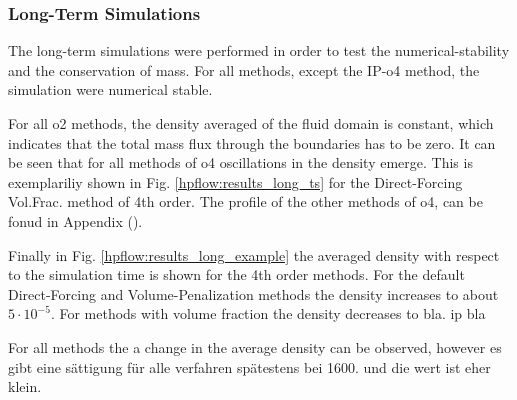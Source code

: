 \subsubsection{Long-Term Simulations}

The long-term simulations were performed in order to test the numerical-stability and the conservation of mass.
For all methods, except the IP-o4 method, the simulation were numerical stable.

For all o2 methods, the density averaged of the fluid domain is constant, which indicates that the total mass flux through the
boundaries has to be zero.
It can be seen that for all methods of o4 oscillations in the density emerge.
This is exemplariliy shown in Fig.  \ref{hpflow:results_long_ts} for the Direct-Forcing Vol.Frac. method of 4th order.
The profile of the other methods of o4, can be fonud in Appendix ().

Finally in Fig. \ref{hpflow:results_long_example} the averaged density with respect to the simulation time is shown for the
4th order methods.
For the default Direct-Forcing and Volume-Penalization methods the density increases to about $5\cdot10^{-5}$.
For methods with volume fraction the density decreases to bla.
ip bla

For all methods the a change in the average density can be observed, however
es gibt eine sättigung für alle verfahren spätestens bei 1600.
und die  wert ist eher klein.

